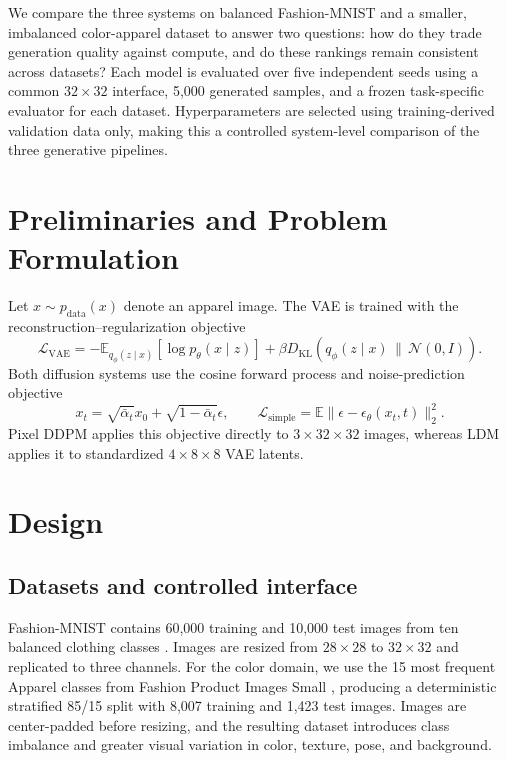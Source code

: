 \documentclass{article}
\begin{document}
We compare the three systems on balanced Fashion-MNIST and a smaller, imbalanced color-apparel dataset to answer two questions: how do they trade generation quality against compute, and do these rankings remain consistent across datasets? Each model is evaluated over five independent seeds using a common $32\times32$ interface, 5,000 generated samples, and a frozen task-specific evaluator for each dataset. Hyperparameters are selected using training-derived validation data only, making this a controlled system-level comparison of the three generative pipelines.

\section{Preliminaries and Problem Formulation}

Let $x\sim p_{\mathrm{data}}(x)$ denote an apparel image. The VAE is trained with the reconstruction--regularization objective
\begin{equation}
\mathcal{L}_{\mathrm{VAE}}
=
-\mathbb{E}_{q_\phi(z\mid x)}[\log p_\theta(x\mid z)]
+
\beta D_{\mathrm{KL}}
\!\left(q_\phi(z\mid x)\,\|\,\mathcal{N}(0,I)\right).
\end{equation}
Both diffusion systems use the cosine forward process \citep{nichol2021improved} and noise-prediction objective
\begin{equation}
x_t=\sqrt{\bar{\alpha}_t}x_0+\sqrt{1-\bar{\alpha}_t}\epsilon,
\qquad
\mathcal{L}_{\mathrm{simple}}
=
\mathbb{E}\|\epsilon-\epsilon_\theta(x_t,t)\|_2^2.
\end{equation}
Pixel DDPM applies this objective directly to $3\times32\times32$ images, whereas LDM applies it to standardized $4\times8\times8$ VAE latents.


\section{Design}

\subsection{Datasets and controlled interface}

Fashion-MNIST contains 60,000 training and 10,000 test images from ten balanced clothing classes \citep{xiao2017fashion}. Images are resized from $28\times28$ to $32\times32$ and replicated to three channels. For the color domain, we use the 15 most frequent Apparel classes from Fashion Product Images Small \citep{fpis}, producing a deterministic stratified 85/15 split with 8,007 training and 1,423 test images. Images are center-padded before resizing, and the resulting dataset introduces class imbalance and greater visual variation in color, texture, pose, and background.
\end{document}

